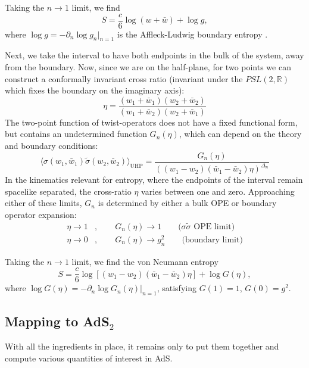 \documentclass[12pt]{article}
\newcommand{\RR}{\mathbb{R}}
\begin{document}
 Taking the $n\to 1$ limit, we find
\begin{equation}\label{eq:UHPS1}
	S = \frac{c}{6}\log(w+\bar{w}) + \log g,
\end{equation}
where $\log g=-\partial_n \log g_n |_{n=1}$ is the Affleck-Ludwig boundary entropy \cite{Affleck_1994}.

Next, we take the interval to have both endpoints in the bulk of the system, away from the boundary. Now, since we are on the half-plane, for two points we can construct a conformally invariant cross ratio (invariant under the $PSL(2,\RR)$ which fixes the boundary on the imaginary axis):
\begin{equation}
	\eta = \frac{(w_1+\bar{w}_1)(w_2+\bar{w}_2)}{(w_1+\bar{w}_2)(w_2+\bar{w}_1)}
\end{equation}
The two-point function of twist-operators does not have a fixed functional form, but contains an undetermined function $G_n(\eta)$, which can depend on the theory and boundary conditions:
\begin{equation}
	\langle\sigma(w_1,\bar{w}_1)\tilde{\sigma}(w_2,\bar{w}_2)\rangle_\text{UHP} = \frac{G_n(\eta)}{\left((w_1-w_2)(\bar{w}_1-\bar{w}_2)\eta\right)^{\Delta_n}}
\end{equation}
In the kinematics relevant for entropy, where the endpoints of the interval remain spacelike separated, the cross-ratio $\eta$ varies between one and zero. Approaching either of these limits, $G_n$ is determined by either a bulk OPE or boundary operator expansion:
\begin{align}
\eta \to 1&,\qquad G_n(\eta)\to 1 \qquad \text{($\sigma\tilde{\sigma}$ OPE limit)}	\\
\eta \to 0&, \qquad G_n(\eta) \to g_n^2 \qquad \text{(boundary limit)}
\end{align}

Taking the $n\to 1$ limit, we find the von Neumann entropy
\begin{equation}\label{eq:UHPS2}
	S = \frac{c}{6}\log\left[(w_1-w_2)(\bar{w}_1-\bar{w}_2)\eta\right] + \log G(\eta),
\end{equation}
where $\log G(\eta) = -\partial_n \log G_n(\eta) |_{n=1}$, satisfying $G(1)=1$, $G(0)=g^2$.



\subsection{Mapping to AdS$_2$}

With all the ingredients in place, it remains only to put them together and compute various quantities of interest in AdS.
\end{document}
